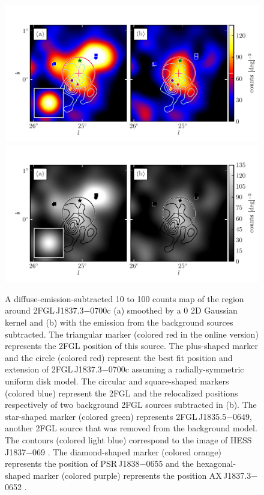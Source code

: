 \begin{figure}
    \ifcolorfigure
      \includegraphics{source_plots/source_HESS_J1837-069_color.pdf}
    \else
      \includegraphics{source_plots/source_HESS_J1837-069_bw.pdf}
    \fi
  \caption{
  A diffuse-emission-subtracted 10 \gev to 100 \gev counts map of the
  region around 2FGL\,J1837.3$-$0700c (a) smoothed by a 0 2D Gaussian
  kernel and (b) with the emission from the background sources subtracted.
  The triangular marker (colored red in the online version) represents
  the 2FGL
  position of this source. 
  The plus-shaped marker and 
  the circle (colored red) represent the best fit position and extension
  of 2FGL\,J1837.3$-$0700c assuming a radially-symmetric uniform disk model. 
  The circular and square-shaped markers (colored
  blue) represent the 2FGL and the relocalized positions respectively of
  two background 2FGL sources subtracted in (b).  The star-shaped marker
  (colored green) represents 2FGL\,J1835.5$-$0649, another 2FGL source that was removed from the
  background model.  The contours (colored light blue) correspond to
  the \tev image of HESS\,J1837$-$069
  \citep{aharonian_2006_h.e.s.s.-survey}.
  The diamond-shaped marker (colored orange) represents the position of PSR\,J1838$-$0655
  and the hexagonal-shaped marker (colored purple) represents the position AX\,J1837.3$-$0652
  \citep{gotthelf_2008a_discovery-young}.
  }
\end{figure}


